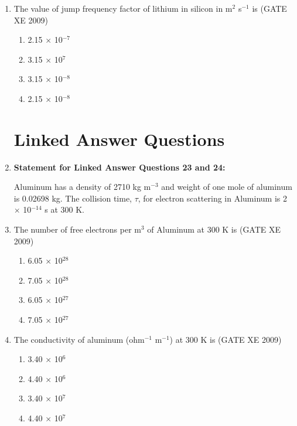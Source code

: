 \documentclass[journal]{IEEEtran}
\begin{document}
\begin{enumerate}
    \item The value of jump frequency factor of lithium in silicon in m$^2$ s$^{-1}$ is \hfill (GATE XE 2009)
    \begin{multicols}{4}
        \begin{enumerate}
            \item 2.15 $\times$ 10$^{-7}$
            \item 3.15 $\times$ 10$^{7}$
            \item 3.15 $\times$ 10$^{-8}$
            \item 2.15 $\times$ 10$^{-8}$
        \end{enumerate}
    \end{multicols}

    \section*{Linked Answer Questions}

    \item[] \textbf{Statement for Linked Answer Questions 23 and 24:}

    Aluminum has a density of 2710 kg m$^{-3}$ and weight of one mole of aluminum is 0.02698 kg. The collision time, $\tau$, for electron scattering in Aluminum is 2 $\times$ 10$^{-14}$ s at 300 K.

    \item The number of free electrons per m$^3$ of Aluminum at 300 K is \hfill (GATE XE 2009)
    \begin{multicols}{4}
        \begin{enumerate}
            \item 6.05 $\times$ 10$^{28}$
            \item 7.05 $\times$ 10$^{28}$
            \item 6.05 $\times$ 10$^{27}$
            \item 7.05 $\times$ 10$^{27}$
        \end{enumerate}
    \end{multicols}

    \item The conductivity of aluminum (ohm$^{-1}$ m$^{-1}$) at 300 K is \hfill (GATE XE 2009)
    \begin{multicols}{4}
        \begin{enumerate}
            \item 3.40 $\times$ 10$^{6}$
            \item 4.40 $\times$ 10$^{6}$
            \item 3.40 $\times$ 10$^{7}$
            \item 4.40 $\times$ 10$^{7}$
        \end{enumerate}
    \end{multicols}
\end{enumerate}
\end{document}
